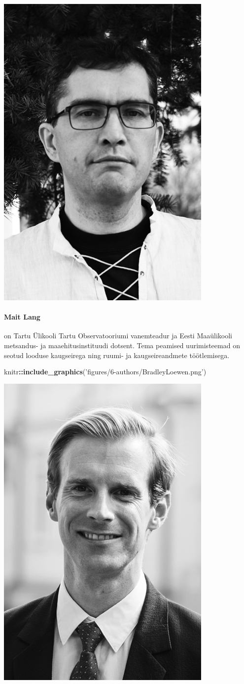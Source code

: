 \documentclass[estonian,]{article}
\newenvironment{Shaded}{\begin{snugshade}}{\end{snugshade}}
\newcommand{\KeywordTok}[1]{\textcolor[rgb]{0.13,0.29,0.53}{\textbf{#1}}}
\newcommand{\NormalTok}[1]{#1}
\newcommand{\OperatorTok}[1]{\textcolor[rgb]{0.81,0.36,0.00}{\textbf{#1}}}
\newcommand{\StringTok}[1]{\textcolor[rgb]{0.31,0.60,0.02}{#1}}
\let\oldparagraph\paragraph
\renewcommand{\paragraph}[1]{\oldparagraph{#1}\mbox{}}
\begin{document}
\begin{flushleft}\includegraphics[width=0.5\linewidth]{figures/6-authors/MaitLang} \end{flushleft}

\hypertarget{mait-lang}{%
\paragraph{Mait Lang}\label{mait-lang}}

on Tartu Ülikooli Tartu Observatooriumi vanemteadur ja Eesti Maaülikooli metsandus- ja maaehitusinstituudi dotsent. Tema peamised uurimisteemad on seotud looduse kaugseirega ning ruumi- ja kaugseireandmete töötlemisega.

\begin{Shaded}
\begin{Highlighting}[]
\NormalTok{knitr}\OperatorTok{::}\KeywordTok{include_graphics}\NormalTok{(}\StringTok{'figures/6-authors/BradleyLoewen.png'}\NormalTok{)}
\end{Highlighting}
\end{Shaded}

\begin{flushleft}\includegraphics[width=0.5\linewidth]{figures/6-authors/BradleyLoewen} \end{flushleft}
\end{document}
